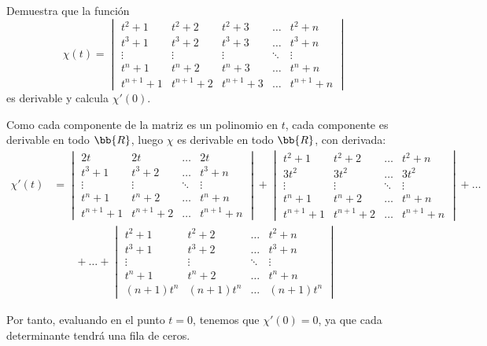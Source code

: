 \documentclass[12pt]{article}
\begin{document}
    \begin{ejercicio}
        Demuestra que la función
        \[
            \chi(t) = \begin{vmatrix}
                t^2+1 & t^2+2 & t^2+3 & \dots & t^2+n \\
                t^3+1 & t^3+2 & t^3+3 & \dots & t^3+n \\
                \vdots & \vdots & \vdots & \ddots & \vdots \\
                t^{n}+1 & t^{n}+2 & t^{n}+3 & \dots & t^{n}+n \\
                t^{n+1}+1 & t^{n+1}+2 & t^{n+1}+3 & \dots & t^{n+1}+n
            \end{vmatrix}
        \]
        es derivable y calcula $\chi'(0)$.

        Como cada componente de la matriz es un polinomio en $t$, cada componente es derivable en todo $\bb{R}$, luego $\chi$ es derivable en todo $\bb{R}$, con derivada:
        \begin{align*}
            \chi'(t) &= \begin{vmatrix}
                2t & 2t & \dots & 2t \\
                t^3+1 & t^3+2 & \dots & t^3+n \\
                \vdots & \vdots & \ddots & \vdots \\
                t^{n}+1 & t^{n}+2 & \dots & t^{n}+n \\
                t^{n+1}+1 & t^{n+1}+2 & \dots & t^{n+1}+n
            \end{vmatrix}
            + \begin{vmatrix}
                t^2+1 & t^2+2 & \dots & t^2+n \\
                3t^2 & 3t^2 & \dots & 3t^2 \\
                \vdots & \vdots & \ddots & \vdots \\
                t^{n}+1 & t^{n}+2 & \dots & t^{n}+n \\
                t^{n+1}+1 & t^{n+1}+2 & \dots & t^{n+1}+n
            \end{vmatrix}
            +\dots\\&\qquad + \dots
            + \begin{vmatrix}
                t^2+1 & t^2+2 & \dots & t^2+n \\
                t^3+1 & t^3+2 & \dots & t^3+n \\
                \vdots & \vdots & \ddots & \vdots \\
                t^{n}+1 & t^{n}+2 & \dots & t^{n}+n \\
                (n+1)t^{n} & (n+1)t^{n} & \dots & (n+1)t^{n}
            \end{vmatrix}
        \end{align*}

        Por tanto, evaluando en el punto $t=0$, tenemos que $\chi'(0)=0$, ya que cada determinante tendrá una fila de ceros.
    \end{ejercicio}
\end{document}
